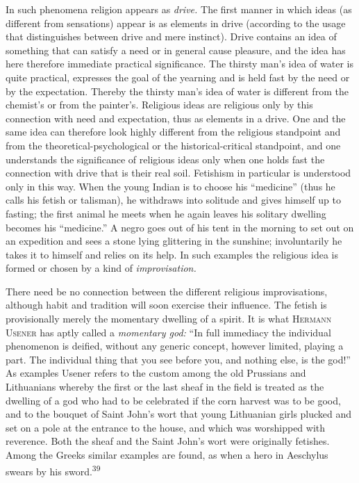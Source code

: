 \documentclass[12pt,a4paper]{book}
\newcommand{\opage}[1]{\marginnote{\footnotesize\textit{[#1]}}}
\begin{document}
In such phenomena religion appears as \emph{drive.} The first manner in which ideas (as
different from sensations) appear is as elements in drive (according to the usage that
distinguishes between drive and mere instinct). Drive contains an idea of something that
can satisfy a need or in general cause pleasure, and the idea has here therefore
immediate practical significance. The thirsty man's idea of water is quite practical,
expresses the goal of the yearning and is held fast by the need or by the expectation.
Thereby the thirsty man's idea of water is different from the chemist's or from the
painter's. Religious ideas are religious only by this connection with need and
expectation, thus as elements in a drive. One and the same idea can therefore look
highly different from the religious standpoint and from the theoretical-psychological or
the historical-critical standpoint, and one understands the significance of religious
ideas only when one holds fast the connection with drive that is their real soil.
Fetishism in particular is understood only in this way. When the young Indian is to
choose his ``medicine'' (thus he calls his fetish or talisman), he withdraws into
solitude and gives himself up to fasting; the first animal he meets when he again leaves
his solitary dwelling becomes his ``medicine.'' A negro goes out of his tent in the
morning to set out on an expedition and sees a stone lying glittering in the sunshine;
involuntarily he takes it 
\opage{90}to himself and relies on its help. In such examples the
religious idea is formed or chosen by a kind of \emph{improvisation.}

There need be no connection between the different religious improvisations, although
habit and tradition will soon exercise their influence. The fetish is provisionally
merely the momentary dwelling of a spirit. It is what \textsc{Hermann Usener} has aptly
called a \emph{momentary god:} ``In full immediacy the individual phenomenon is deified,
without any generic concept, however limited, playing a part. The individual thing that
you see before you, and nothing else, is the god!'' As examples Usener refers to the
custom among the old Prussians and Lithuanians whereby the first or the last sheaf in the
field is treated as the dwelling of a god who had to be celebrated if the corn harvest
was to be good, and to the bouquet of Saint John's wort that young Lithuanian girls
plucked and set on a pole at the entrance to the house, and which was worshipped with
reverence. Both the sheaf and the Saint John's wort were originally fetishes. Among the
Greeks similar examples are found, as when a hero in Aeschylus swears by his
sword.\textsuperscript{39}
\end{document}
